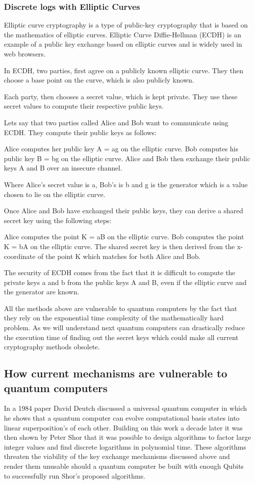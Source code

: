 \documentclass{article}
\begin{document}
\subsubsection{Discrete logs with Elliptic Curves}
Elliptic curve cryptography is a type of public-key cryptography that is based on the mathematics of elliptic curves. Elliptic Curve Diffie-Hellman (ECDH) is an example of a public key exchange based on elliptic curves and is widely used in web browsers.

In ECDH, two parties, first agree on a publicly known elliptic curve. They then choose a base point on the curve, which is also publicly known.

Each party, then chooses a secret value, which is kept private. They use these secret values to compute their respective public keys.

Lets say that two parties called Alice and Bob want to communicate using ECDH. They compute their public keys as follows:

Alice computes her public key A = ag on the elliptic curve.
Bob computes his public key B = bg on the elliptic curve.
Alice and Bob then exchange their public keys A and B over an insecure channel.

Where Alice's secret value is a, Bob's is b and g is the generator which is a value chosen to lie on the elliptic curve.

Once Alice and Bob have exchanged their public keys, they can derive a shared secret key using the following steps:

Alice computes the point K = aB on the elliptic curve.
Bob computes the point K = bA on the elliptic curve.
The shared secret key is then derived from the x-coordinate of the point K which matches for both Alice and Bob.

The security of ECDH comes from the fact that it is difficult to compute the private keys a and b from the public keys A and B, even if the elliptic curve and the generator are known.

All the methods above are vulnerable to quantum computers by the fact that they rely on the exponential time complexity of the mathematically hard problem. As we will understand next quantum computers can drastically reduce the execution time of finding out the secret keys which could make all current cryptography methods obsolete.

\subsection{How current mechanisms are vulnerable to quantum computers}
In a 1984 paper David Deutch \cite{Deutsch1985QuantumComputer} discussed a universal quantum computer in which he shows that a quantum computer can evolve computational basis states into linear superposition's of each other. Building on this work a decade later it was then shown by Peter Shor \cite{Shor1994AlgorithmsFactoring} that it was possible to design algorithms to factor large integer values and find discrete logarithms in polynomial time. These algorithms threaten the viability of the key exchange mechanisms discussed above and render them unusable should a quantum computer be built with enough Qubits to successfully run Shor's proposed algorithms.
\end{document}
